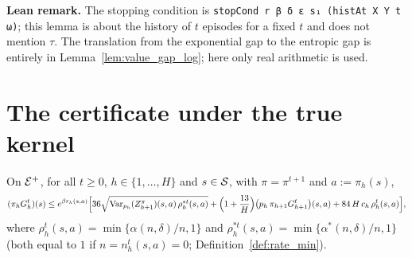 \textbf{Lean remark.} The stopping condition is \texttt{stopCond r β δ ε s₁ (histAt X Y t ω)};
this lemma is about the history of $t$ episodes for a fixed $t$ and does not mention $\tau$. The
translation from the exponential gap to the entropic gap is entirely in
Lemma~\ref{lem:value_gap_log}; here only real arithmetic is used.

\section{The certificate under the true kernel}
\label{sec:pos_true_kernel}

\begin{lemma}\label{lem:cert_true_recursion_pos}
\leanok
{}
On $\mathcal{E}^+$, for all $t \ge 0$, $h \in \{1, \dots, H\}$ and $s \in \mathcal{S}$, with $\pi = \pi^{t+1}$ and
$a := \pi_h(s)$,
\[
  (\pi_hG_h^t)(s) \le e^{\beta r_h(s,a)}\Big[
    36\sqrt{\operatorname{Var}_{p_h}(Z^\pi_{h+1})(s,a)\,\rho^{*t}_h(s,a)}
    + \Big(1 + \frac{13}{H}\Big)\big(p_h\,\pi_{h+1}G^t_{h+1}\big)(s,a)
    + 84\,H\,c_h\,\rho^t_h(s,a)\Big] ,
\]
where $\rho^t_h(s,a) = \min\{\alpha(n,\delta)/n, 1\}$ and $\rho^{*t}_h(s,a) = \min\{\alpha^*(n,\delta)/n, 1\}$
(both equal to $1$ if $n = n_h^t(s,a) = 0$; Definition~\ref{def:rate_min}).
\end{lemma}

